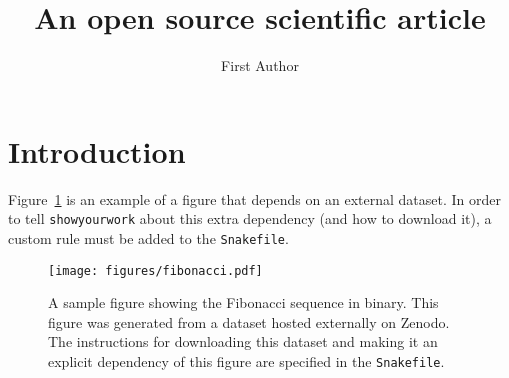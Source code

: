 \documentclass[twocolumn]{aastex631}
\begin{document}
\title{An open source scientific article}

\author{First Author}

\begin{abstract}
    \blindtext
\end{abstract}

\section{Introduction}

Figure~\ref{fig:fibonacci} is an example of a figure that depends on an external dataset.
In order to tell \texttt{showyourwork} about this extra dependency (and how to download it), a custom rule must be added to the \texttt{Snakefile}.

\begin{figure}[ht!]
    \begin{centering}
        \texttt{[image: figures/fibonacci.pdf]}
        \caption{
            A sample figure showing the Fibonacci sequence in binary.
            This figure was generated from a dataset hosted externally on Zenodo. 
            The instructions for downloading this dataset and making it an explicit dependency of this figure are specified in the \texttt{Snakefile}.
        }
        \label{fig:fibonacci}
    \end{centering}
\end{figure}
\end{document}
